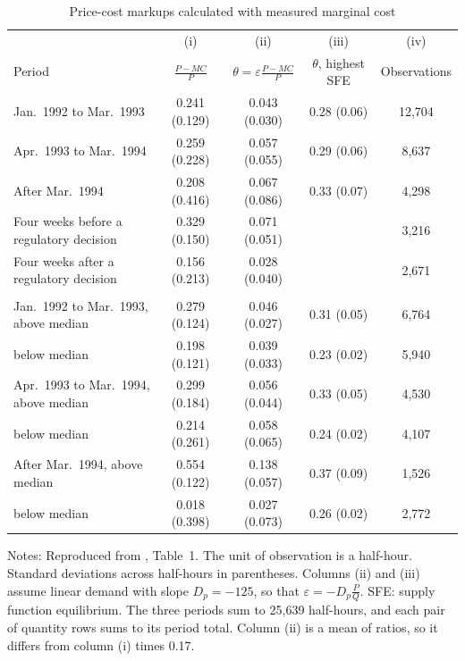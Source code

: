 \begin{table}[htbp]
\centering
\begin{threeparttable}
\caption{Price-cost markups calculated with measured marginal cost}
\label{tab:03-wolfram}
\small
\setlength{\tabcolsep}{4.5pt}
\begin{tabular}{@{}lcccc@{}}
\toprule
& (i) & (ii) & (iii) & (iv) \\
Period & $\frac{P - MC}{P}$ & $\theta = \varepsilon\frac{P - MC}{P}$ & $\theta$, highest SFE & Observations \\
\midrule
Jan.~1992 to Mar.~1993 & 0.241 (0.129) & 0.043 (0.030) & 0.28 (0.06) & 12,704 \\
Apr.~1993 to Mar.~1994 & 0.259 (0.228) & 0.057 (0.055) & 0.29 (0.06) & 8,637 \\
After Mar.~1994 & 0.208 (0.416) & 0.067 (0.086) & 0.33 (0.07) & 4,298 \\
\addlinespace
Four weeks before a regulatory decision & 0.329 (0.150) & 0.071 (0.051) & & 3,216 \\
Four weeks after a regulatory decision & 0.156 (0.213) & 0.028 (0.040) & & 2,671 \\
\addlinespace
\multicolumn{5}{@{}l}{\emph{By quantity level}} \\
Jan.~1992 to Mar.~1993, above median & 0.279 (0.124) & 0.046 (0.027) & 0.31 (0.05) & 6,764 \\
\phantom{Jan.~1992 to Mar.~1993,} below median & 0.198 (0.121) & 0.039 (0.033) & 0.23 (0.02) & 5,940 \\
Apr.~1993 to Mar.~1994, above median & 0.299 (0.184) & 0.056 (0.044) & 0.33 (0.05) & 4,530 \\
\phantom{Apr.~1993 to Mar.~1994,} below median & 0.214 (0.261) & 0.058 (0.065) & 0.24 (0.02) & 4,107 \\
After Mar.~1994, above median & 0.554 (0.122) & 0.138 (0.057) & 0.37 (0.09) & 1,526 \\
\phantom{After Mar.~1994,} below median & 0.018 (0.398) & 0.027 (0.073) & 0.26 (0.02) & 2,772 \\
\bottomrule
\end{tabular}
\begin{tablenotes}\footnotesize
\item Notes: Reproduced from \citet{Wolfram1999}, Table~1. The unit of observation is a half-hour. Standard deviations
across half-hours in parentheses. Columns (ii) and (iii) assume linear demand with slope $D_p = -125$, so that
$\varepsilon = -D_p\frac{P}{Q}$. SFE: supply function equilibrium. The three periods sum to 25,639 half-hours, and each
pair of quantity rows sums to its period total. Column (ii) is a mean of ratios, so it differs from column (i) times
0.17.
\end{tablenotes}
\end{threeparttable}
\end{table}


